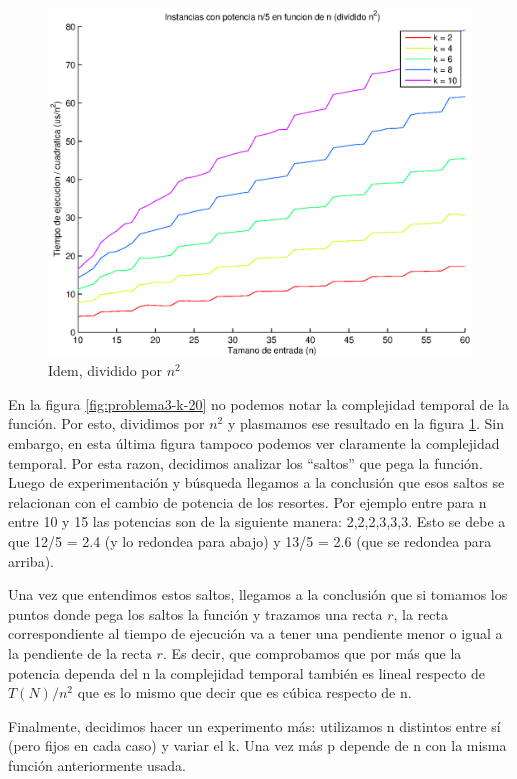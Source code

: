 \begin{figure}[H]
\begin{minipage}{0.5\linewidth}
    \includegraphics[width=\linewidth]{img/problema3/instancia_p_20p_varios_k_div_n2.eps}
    \caption{Idem, dividido por $n^2$}\label{fig:problema3-k-n2-20}
  \end{minipage}	
\end{figure}

En la figura \ref{fig:problema3-k-20} no podemos notar la complejidad temporal de la función. Por esto, dividimos por $n^2$ y plasmamos ese resultado en la figura \ref{fig:problema3-k-n2-20}. Sin embargo, en esta última figura tampoco podemos ver claramente la complejidad temporal. Por esta razon, decidimos analizar los ``saltos'' que pega la función. Luego de experimentación y búsqueda llegamos a la conclusión que esos saltos se relacionan con el cambio de potencia de los resortes. Por ejemplo entre para n entre 10 y 15 las potencias son de la siguiente manera: 2,2,2,3,3,3. Esto se debe a que 12/5 = 2.4 (y lo redondea para abajo) y 13/5 = 2.6 (que se redondea para arriba).

Una vez que entendimos estos saltos, llegamos a la conclusión que si tomamos los puntos donde pega los saltos la función y trazamos una recta $r$, la recta correspondiente al tiempo de ejecución va a tener una pendiente menor o igual a la pendiente de la recta $r$. Es decir, que comprobamos que por más que la potencia dependa del n la complejidad temporal también es lineal respecto de $T(N)/n^2$ que es lo mismo que decir que es cúbica respecto de n.

Finalmente, decidimos hacer un experimento más: utilizamos n distintos entre sí (pero fijos en cada caso) y variar el k. Una vez más p depende de n con la misma función anteriormente usada.

